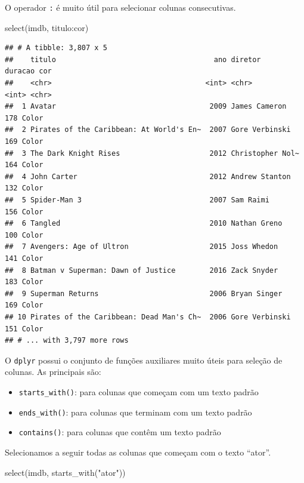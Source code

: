 \documentclass[
]{book}
\newenvironment{Shaded}{\begin{snugshade}}{\end{snugshade}}
\newcommand{\FunctionTok}[1]{\textcolor[rgb]{0.00,0.00,0.00}{#1}}
\newcommand{\NormalTok}[1]{#1}
\newcommand{\SpecialCharTok}[1]{\textcolor[rgb]{0.00,0.00,0.00}{#1}}
\newcommand{\StringTok}[1]{\textcolor[rgb]{0.31,0.60,0.02}{#1}}
\providecommand{\tightlist}{%
  \setlength{\itemsep}{0pt}\setlength{\parskip}{0pt}}
\begin{document}
O operador \texttt{:} é muito útil para selecionar colunas consecutivas.

\begin{Shaded}
\begin{Highlighting}[]
\FunctionTok{select}\NormalTok{(imdb, titulo}\SpecialCharTok{:}\NormalTok{cor)}
\end{Highlighting}
\end{Shaded}

\begin{verbatim}
## # A tibble: 3,807 x 5
##    titulo                                     ano diretor          duracao cor  
##    <chr>                                    <int> <chr>              <int> <chr>
##  1 Avatar                                    2009 James Cameron        178 Color
##  2 Pirates of the Caribbean: At World's En~  2007 Gore Verbinski       169 Color
##  3 The Dark Knight Rises                     2012 Christopher Nol~     164 Color
##  4 John Carter                               2012 Andrew Stanton       132 Color
##  5 Spider-Man 3                              2007 Sam Raimi            156 Color
##  6 Tangled                                   2010 Nathan Greno         100 Color
##  7 Avengers: Age of Ultron                   2015 Joss Whedon          141 Color
##  8 Batman v Superman: Dawn of Justice        2016 Zack Snyder          183 Color
##  9 Superman Returns                          2006 Bryan Singer         169 Color
## 10 Pirates of the Caribbean: Dead Man's Ch~  2006 Gore Verbinski       151 Color
## # ... with 3,797 more rows
\end{verbatim}

O \texttt{dplyr} possui o conjunto de funções auxiliares muito úteis para seleção de colunas. As principais são:

\begin{itemize}
\tightlist
\item
  \texttt{starts\_with()}: para colunas que começam com um texto padrão
\item
  \texttt{ends\_with()}: para colunas que terminam com um texto padrão
\item
  \texttt{contains()}: para colunas que contêm um texto padrão
\end{itemize}

Selecionamos a seguir todas as colunas que começam com o texto ``ator''.

\begin{Shaded}
\begin{Highlighting}[]
\FunctionTok{select}\NormalTok{(imdb, }\FunctionTok{starts\_with}\NormalTok{(}\StringTok{"ator"}\NormalTok{))}
\end{Highlighting}
\end{Shaded}
\end{document}
